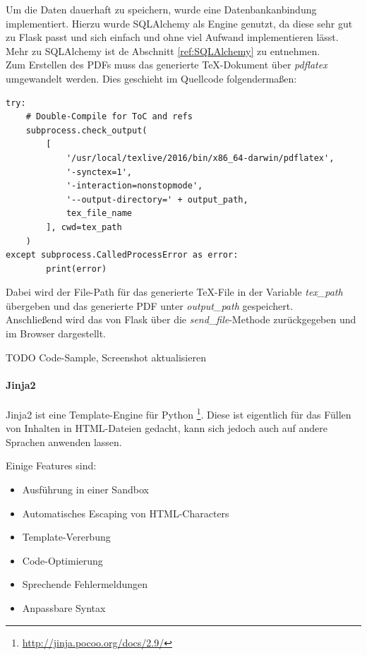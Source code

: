 Um die Daten dauerhaft zu speichern, wurde eine Datenbankanbindung implementiert. Hierzu wurde SQLAlchemy als Engine genutzt, da diese sehr gut zu Flask passt und sich einfach und ohne viel Aufwand implementieren lässt. Mehr zu SQLAlchemy ist de Abschnitt \ref{ref:SQLAlchemy} zu entnehmen.\\

Zum Erstellen des PDFs muss das generierte TeX-Dokument über \textit{pdflatex} umgewandelt werden. Dies geschieht im Quellcode folgendermaßen:
\begin{lstlisting}
try:
    # Double-Compile for ToC and refs
    subprocess.check_output(
        [
            '/usr/local/texlive/2016/bin/x86_64-darwin/pdflatex',
            '-synctex=1',
            '-interaction=nonstopmode',
            '--output-directory=' + output_path,
            tex_file_name
        ], cwd=tex_path
    )
except subprocess.CalledProcessError as error:
        print(error)
\end{lstlisting}
Dabei wird der File-Path für das generierte TeX-File in der Variable \textit{tex\_path} übergeben und das generierte PDF unter \textit{output\_path} gespeichert.\\

Anschließend wird das von Flask über die \textit{send\_file}-Methode zurückgegeben und im Browser dargestellt.

TODO Code-Sample, Screenshot aktualisieren

\paragraph{Jinja2}\label{jinja2}
Jinja2 ist eine Template-Engine für Python \footnote{\url{http://jinja.pocoo.org/docs/2.9/}}. Diese ist eigentlich für das Füllen von Inhalten in HTML-Dateien gedacht, kann sich jedoch auch auf andere Sprachen anwenden lassen.

Einige Features sind:
\begin{itemize}
    \item Ausführung in einer Sandbox
    \item Automatisches Escaping von HTML-Characters
    \item Template-Vererbung
    \item Code-Optimierung
    \item Sprechende Fehlermeldungen
    \item Anpassbare Syntax
\end{itemize}

